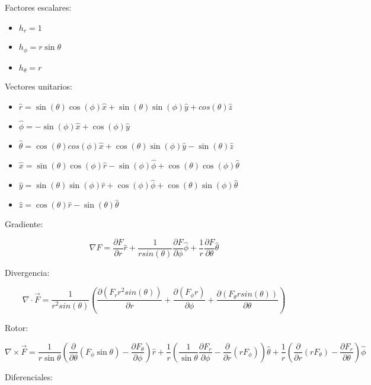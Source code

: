 \bigbreak
Factores escalares:
\begin{itemize}
    \item $h_r = 1$
    \item $h_\phi = r\sin{\theta}$
    \item $h_\theta = r$
\end{itemize}
\bigbreak
Vectores unitarios:

\begin{itemize}
    \item $\hat{r} = \sin(\theta)\cos(\phi)\hat{x} + \sin(\theta)\sin(\phi)\hat{y} + cos(\theta)\hat{z}$
    \item $\hat{\phi} = -\sin(\phi)\hat{x}+\cos(\phi)\hat{y}$
    \item $\hat{\theta} = \cos(\theta)cos(\phi)\hat{x} + \cos(\theta)\sin(\phi)\hat{y}-\sin(\theta)\hat{z}$
    \item $\hat{x}=\sin{(\theta)\cos{(\phi)}}\hat{r}-\sin{(\phi)}\hat{\phi}+\cos{(\theta)}\cos{(\phi)}\hat{\theta}$
    \item $\hat{y}=\sin{(\theta)\sin{(\phi)}}\hat{r}+\cos{(\phi)}\hat{\phi}+\cos{(\theta)}\sin{(\phi)}\hat{\theta}$
    \item $\hat{z}=\cos{(\theta)}\hat{r}-\sin{(\theta)}\hat{\theta}$
\end{itemize}

\bigbreak

Gradiente:

\[\nabla F = \frac{\partial F}{\partial r}\hat{r} + \frac{1}{rsin(\theta)}\frac{\partial F}{\partial \phi}\hat{\phi} + \frac{1}{r}\frac{\partial F}{\partial \theta}\hat{\theta}\]

Divergencia:

\[\nabla \cdot \vec{F} = \frac{1}{r^2sin(\theta)}\left(\frac{\partial(F_{r}r^2sin(\theta))}{\partial r}+\frac{\partial (F_{\phi}r)}{\partial\phi}+\frac{\partial(F_{\theta}rsin(\theta))}{\partial \theta}\right)\]

Rotor:

\[\nabla\times\vec{F} = \frac{1}{r\sin\theta} \left( \frac{\partial}{\partial \theta} \left(F_\phi\sin\theta \right) - \frac{\partial F_\theta}{\partial \phi} \right) \hat{r} + \frac{1}{r} \left( \frac{1}{\sin\theta} \frac{\partial F_r}{\partial \phi} - \frac{\partial}{\partial r} \left( r F_\phi \right) \right) \hat{\theta} + \frac{1}{r} \left( \frac{\partial}{\partial r} \left( r F_{\theta} \right) - \frac{\partial F_r}{\partial \theta} \right) \hat{\phi}\]

Diferenciales:

